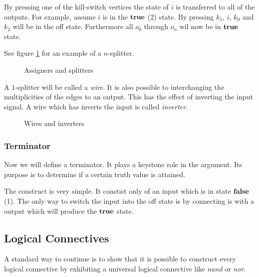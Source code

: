 By pressing one of the kill-switch vertices the state of $i$ is transferred to
all of the outputs. For example, assume $i$ is in the $\text{\bf true}$ (2) state. By
pressing $k_{1}$, $i$, $k_{0}$ and $k_{2}$ will be in the off state. Furthermore
all $o_{0}$ through $o_{n}$ wil now be in $\text{\bf true}$ state.

See figure \ref{figure:constructsA} for an example of a $n$-splitter.
\begin{figure}
	\begin{center}
	\end{center}
	\caption{Assigners and splitters}\label{figure:constructsA}
\end{figure}

A $1$-splitter will be called a \emph{wire}. It is also possible to 
interchanging the multiplicities of the edges to an output. This has the effect
of inverting the input signal. A wire which has inverts the input is called
\emph{inverter}.
\begin{figure}
	\begin{center}
	\end{center}
	\caption{Wires and inverters}\label{figure:constructsB}
\end{figure}

\subsubsection{Terminator}

Now we will define a terminator. It plays a keystone role in the argument. Its
purpose is to determine if a certain truth value is attained.

The construct is very simple. It constist only of an input which is in state 
${\text{\bf false}}$ (1). The only way to switch the input into the off state is by connecting
is with a output which will produce the $\text{\bf true}$ state.

\subsection{Logical Connectives}

A standard way to continue is to show that it is possible to construct
every logical connective by exhibiting a universal logical connective
like \emph{nand} or \emph{nor}.


